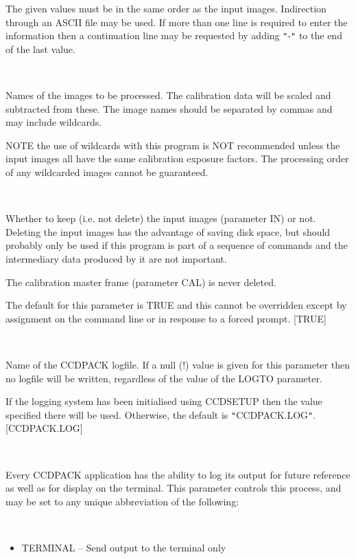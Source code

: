\documentclass[twoside,11pt]{article}
\newcommand{\htmlref}[2]{#1}
\renewcommand{\_}{\texttt{\symbol{95}}}
\newcommand{\qt}[1]{{\tt "}#1{\tt "}}
\newcommand{\xroutine}[1]{\htmlref{{\sc #1}}{#1}}
\newcommand{\sstsubsection}[1]{ \item[{#1}] \mbox{} \\}
\newcommand{\sstitemlist}[1]{
  \mbox{} \\
  \vspace{-3.5ex}
  \begin{itemize}
     #1
  \end{itemize}
}
\newcommand{\sstitem}{\item}
\newcommand{\sstsubsection}[1]{\item[{#1}]}
\newcommand{\sstitemlist}[1]{
      \begin{itemize}
         #1
      \end{itemize}
      \\
   }
\newcommand{\sstitem}{\item}
\begin{document}
{{{         The given values must be in the same order as the input images.
         Indirection through an ASCII file may be used.  If more than
         one line is required to enter the information then a
         continuation line may be requested by adding \qt{-} to the end of
         the last value.
      }
      \sstsubsection{
         IN = LITERAL (Read)
      } {
         Names of the images to be processed. The calibration data will be
         scaled and subtracted from these.  The image names should be
         separated by commas and may include wildcards.

         NOTE the use of wildcards with this program is NOT recommended
         unless the input images all have the same calibration exposure
         factors. The processing order of any wildcarded images cannot
         be guaranteed.
      }
      \sstsubsection{
         KEEPIN = \_LOGICAL (Read)
      } {
         Whether to keep (i.e. not delete) the input images (parameter IN)
         or not. Deleting the input images has the advantage of saving
         disk space, but should probably only be used if this program
         is part of a sequence of commands and the intermediary data
         produced by it are not important.

         The calibration master frame (parameter CAL) is never deleted.

         The default for this parameter is TRUE and this cannot be
         overridden except by assignment on the command line or in
         response to a forced prompt.
         [TRUE]
      }
      \sstsubsection{
         LOGFILE = FILENAME (Read)
      } {
         Name of the CCDPACK logfile.  If a null (!) value is given for
         this parameter then no logfile will be written, regardless of
         the value of the LOGTO parameter.

         If the logging system has been initialised using \xroutine{CCDSETUP}
         then the value specified there will be used. Otherwise, the
         default is \qt{CCDPACK.LOG}.
         [CCDPACK.LOG]
      }
      \sstsubsection{
         LOGTO = LITERAL (Read)
      } {
         Every CCDPACK application has the ability to log its output
         for future reference as well as for display on the terminal.
         This parameter controls this process, and may be set to any
         unique abbreviation of the following:
         \sstitemlist{

            \sstitem
               TERMINAL  -- Send output to the terminal only

}}}}
\end{document}
